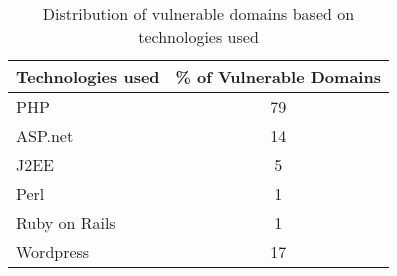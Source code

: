 \begin{wraptable}{r}{5.5cm}
	\centering
	\scriptsize
	\begin{tabular}{|l|c|}
		\hline
		Technologies used & \% of Vulnerable Domains \\
		\hline
		PHP & 79 \\
		\hline
		ASP.net & 14 \\
		\hline
		J2EE & 5 \\
		\hline
		Perl & 1 \\
		\hline
		Ruby on Rails & 1 \\
		\hline
		Wordpress & 17 \\
		\hline
	\end{tabular}
	\caption[]{Distribution of vulnerable domains based on technologies used}
	\vspace{-5ex}
	\label{tab:lang_used}
\end{wraptable}
